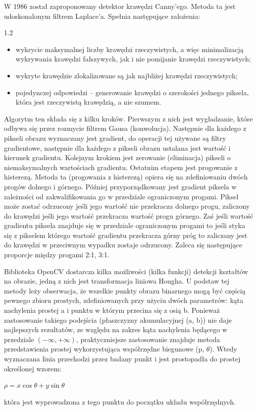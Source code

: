 \documentclass[a4paper,12pt]{article}
\newcommand\spacingInSolemnItemize{1.2}
\begin{document}
		        W 1986 został zaproponowany detektor krawędzi Canny'ego. Metoda ta jest udoskonalonym filtrem Laplace'a. Spełnia następujące założenia: 
		        \begin{spacing}{\spacingInSolemnItemize}
    		        \begin{itemize}
    		            \item wykrycie maksymalnej liczby krawędzi rzeczywistych, a więc minimalizacją wykrywania krawędzi fałszywych, jak i nie pomijanie krawędzi rzeczywistych;
    		            \item wykryte krawędzie  zlokalizowane są jak najbliżej krawędzi rzeczywistych;
    		            \item pojedynczej odpowiedzi -- generowanie krawędzi o szerokości jednego piksela, która jest rzeczywistą krawędzią, a nie szumem.
    		        \end{itemize}
		        \end{spacing}
		        
		        Algorytm ten składa się z kilku kroków. Pierwszym z nich jest wygładzanie, które odbywa się przez rozmycie filtrem Gausa (konwolucja). Następnie dla każdego z pikseli obrazu wyznaczany jest gradient, do operacji tej używane są filtry gradientowe, następnie dla każdego z pikseli obrazu ustalana jest wartość i kierunek gradientu. Kolejnym krokiem jest zerowanie (eliminacja) pikseli o niemaksymalnych wartościach gradientu. Ostatnim etapem jest progowanie z histerezą. Metoda ta (progowania z histerezą) opiera się na zdefiniowaniu dwóch progów dolnego i górnego. Później przyporządkowany jest gradient piksela w zależności od zakwalifikowania go w przedziale ograniczonym progami. Piksel może zostać odrzucony jeśli jego wartość nie przekracza dolnego progu, zaliczony do krawędzi jeśli jego wartość przekracza wartość progu górnego. Zaś jeśli wartość gradientu piksela znajduje się w przedziale ograniczonym progami to jeśli styka się z pikselem którego wartość gradientu przekracza górny próg to zaliczany jest do krawędzi w przeciwnym wypadku zostaje odrzucony. Zaleca się następujące proporcje między progami 2:1, 3:1.
		
        		Biblioteka OpenCV dostarcza kilka możliwości (kilka funkcji) detekcji kształtów na obrazie, jedną z nich jest transformacja liniowa Hougha. U podstaw tej metody leży obserwacja, że wszelkie punkty obrazu binarnego mogą być częścią pewnego zbioru prostych, zdefiniowanych przy użyciu dwóch parametrów: kąta nachylenia prostej a i punktu w którym przecina się z osią b. 
		        Ponieważ zastosowanie takiego podejścia (płaszczyzny akumulacyjnej (a, b)) nie daje najlepszych rezultatów, ze względu na zakres kąta nachylenia będącego w przedziale $(-\infty, +\infty)$, praktyczniejsze zastosowanie znajduje metoda przedstawienia prostej wykorzystująca współrzędne biegunowe (p, $\theta$). Wtedy wyznaczana linia przechodzi przez badany punkt i jest prostopadła do prostej określonej wzorem:
		        \begin{center}
		        $\rho = x \cos \theta + y \sin \theta$ 
		        \end{center} 
		        która jest wyprowadzona z tego punktu do początku układu współrzędnych.
		
\end{document}
